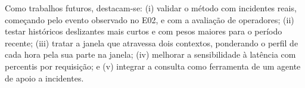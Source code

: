 \documentclass[sigconf,nonacm]{acmart}
\begin{document}
Como trabalhos futuros, destacam-se: (i) validar o método com incidentes reais, começando pelo evento observado no E02, e com a avaliação de operadores; (ii) testar históricos deslizantes mais curtos e com pesos maiores para o período recente; (iii) tratar a janela que atravessa dois contextos, ponderando o perfil de cada hora pela sua parte na janela; (iv) melhorar a sensibilidade à latência com percentis por requisição; e (v) integrar a consulta como ferramenta de um agente de apoio a incidentes.



\end{document}
